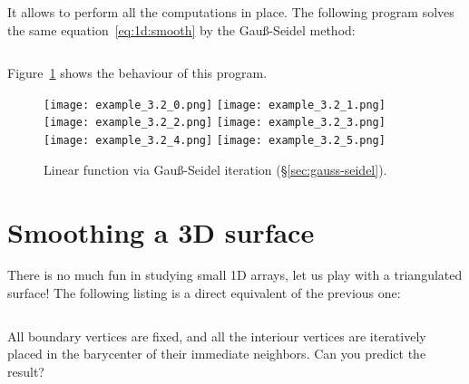 \documentclass[notitlepage,oneside]{book}
\begin{document}
It allows to perform all the computations in place. The following program solves the same equation~\eqref{eq:1d:smooth} by the Gauß-Seidel method:
\inputminted[frame=single,linenos=true]{python}{listings/example_3.2.py}
Figure~\ref{fig:arraysmooth_gs} shows the behaviour of this program.

\begin{figure}[ht]
    \centering
    \texttt{[image: example\_3.2\_0.png]}
    \texttt{[image: example\_3.2\_1.png]}
    \texttt{[image: example\_3.2\_2.png]}
    \texttt{[image: example\_3.2\_3.png]}
    \texttt{[image: example\_3.2\_4.png]}
    \texttt{[image: example\_3.2\_5.png]}
    \caption{Linear function via Gauß-Seidel iteration (\S\ref{sec:gauss-seidel}).}
    \label{fig:arraysmooth_gs}
\end{figure}

\section{Smoothing a 3D surface}
\label{sec:3dsmooth}
There is no much fun in studying small 1D arrays, let us play with a triangulated surface! The following listing is a direct equivalent of the previous one:
\inputminted[frame=single,linenos=true]{cpp}{listings/example_3.3.cpp}
All boundary vertices are fixed, and all the interiour vertices are iteratively placed in the barycenter of their immediate neighbors.
Can you predict the result?
\end{document}
